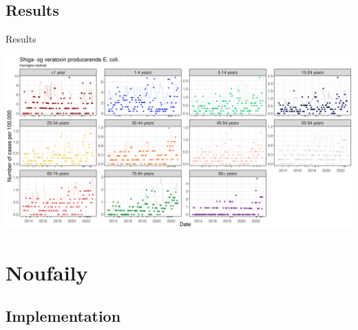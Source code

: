 \documentclass[aspectratio=169]{beamer}
\begin{document}
\hypertarget{results}{%
\subsection{Results}\label{results}}

\begin{frame}{Results}
\tiny

\includegraphics[width=1\linewidth]{../figures/STEC_farrington}

\normalsize
\end{frame}

\hypertarget{noufaily}{%
\section{Noufaily}\label{noufaily}}

\hypertarget{implementation-1}{%
\subsection{Implementation}\label{implementation-1}}
\end{document}
